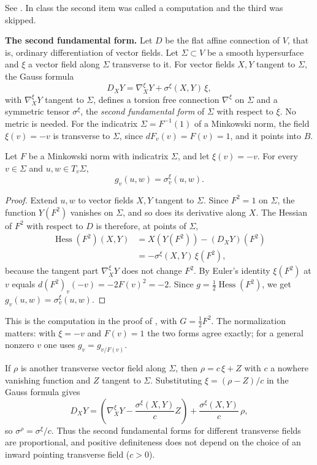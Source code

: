\noindent
See \cite[Proposition 2.2]%
{javaloyes2014definition}. In class the
second item was called a computation and
the third was skipped.

\medskip\noindent
{\bf The second fundamental form.}
Let $D$ be the flat affine connection of
$V$, that is, ordinary differentiation of
vector fields. Let $\Sigma \subset V$ be a
smooth hypersurface and $\xi$ a vector
field along $\Sigma$ transverse to it. For
vector fields $X, Y$ tangent to $\Sigma$,
the Gauss formula
$$
D_X Y = \nabla^\xi_X Y
+ \sigma^\xi(X,Y)\, \xi,
$$
with $\nabla^\xi_X Y$ tangent to $\Sigma$,
defines a torsion free connection
$\nabla^\xi$ on $\Sigma$ and a symmetric
tensor $\sigma^\xi$, the \emph{second
fundamental form} of $\Sigma$ with respect
to $\xi$. No metric is needed. For the
indicatrix $\Sigma = F^{-1}(1)$ of a
Minkowski norm, the field
$\xi(v) = -v$ is transverse to $\Sigma$,
since $dF_v(v) = F(v) = 1$, and it points
into $B$.

\begin{proposition}
\label{proposition-javaloyes-second-form}
Let $F$ be a Minkowski norm with indicatrix
$\Sigma$, and let $\xi(v) = -v$. For every
$v \in \Sigma$ and $u, w \in T_v\Sigma$,
$$
g_v(u,w) = \sigma^\xi_v(u,w).
$$
\end{proposition}

\begin{proof}
Extend $u, w$ to vector fields $X, Y$
tangent to $\Sigma$. Since $F^2 = 1$ on
$\Sigma$, the function $Y(F^2)$ vanishes on
$\Sigma$, and so does its derivative along
$X$. The Hessian of $F^2$ with respect to
$D$ is therefore, at points of $\Sigma$,
$$
\begin{aligned}
\operatorname{Hess}(F^2)(X,Y)
&= X(Y(F^2)) - (D_X Y)(F^2) \\
&= -\sigma^\xi(X,Y)\, \xi(F^2),
\end{aligned}
$$
because the tangent part $\nabla^\xi_X Y$
does not change $F^2$. By Euler's identity
$\xi(F^2)$ at $v$ equals
$d(F^2)_v(-v) = -2F(v)^2 = -2$. Since
$g = \frac{1}{2}\operatorname{Hess}(F^2)$,
we get $g_v(u,w) = \sigma^\xi_v(u,w)$.
\end{proof}

\noindent
This is the computation in the proof of
\cite[Proposition 2.3]%
{javaloyes2014definition}, with
$G = \frac{1}{2}F^2$. The normalization
matters: with $\xi = -v$ and $F(v) = 1$ the
two forms agree exactly; for a general
nonzero $v$ one uses $g_v = g_{v/F(v)}$.

\begin{remark}
\label{remark-javaloyes-change-transversal}
If $\rho$ is another transverse vector field
along $\Sigma$, then
$\rho = c\,\xi + Z$ with $c$ a nowhere
vanishing function and $Z$ tangent to
$\Sigma$. Substituting
$\xi = (\rho - Z)/c$ in the Gauss formula
gives
$$
D_X Y = \left(\nabla^\xi_X Y
- \frac{\sigma^\xi(X,Y)}{c} Z\right)
+ \frac{\sigma^\xi(X,Y)}{c}\, \rho,
$$
so $\sigma^\rho = \sigma^\xi / c$. Thus the
second fundamental forms for different
transverse fields are proportional, and
positive definiteness does not depend on
the choice of an inward pointing
transverse field ($c > 0$).
\end{remark}

